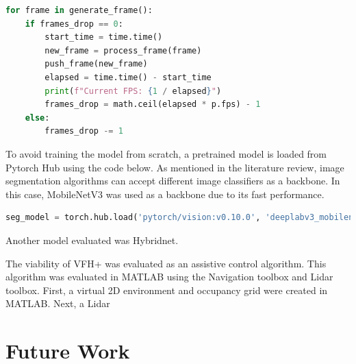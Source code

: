 \documentclass[12pt]{article}
\begin{document}
\begin{lstlisting}[language=Python]
for frame in generate_frame():
    if frames_drop == 0:
        start_time = time.time()
        new_frame = process_frame(frame)
        push_frame(new_frame)
        elapsed = time.time() - start_time
        print(f"Current FPS: {1 / elapsed}")
        frames_drop = math.ceil(elapsed * p.fps) - 1
    else:
        frames_drop -= 1
\end{lstlisting}

To avoid training the model from scratch, a pretrained model is loaded from Pytorch Hub using the code below.
As mentioned in the literature review, image segmentation algorithms can accept different image classifiers as a backbone.
In this case, MobileNetV3 \cite{howardSearchingMobileNetV32019} was used as a backbone due to its fast performance.

\begin{lstlisting}[language=Python]
seg_model = torch.hub.load('pytorch/vision:v0.10.0', 'deeplabv3_mobilenet_v3_large', pretrained=True)
\end{lstlisting}

Another model evaluated was Hybridnet.

The viability of VFH+ was evaluated as an assistive control algorithm. This algorithm was evaluated
in MATLAB using the Navigation toolbox and Lidar toolbox.
First, a virtual 2D environment and occupancy grid were created in MATLAB.
Next, a Lidar 

\pagebreak





\section{Future Work}

\pagebreak





\printbibliography[heading=bibnumbered]
\end{document}
